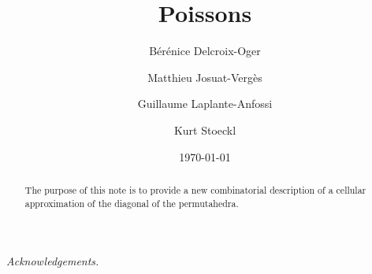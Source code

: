 \documentclass[11pt]{amsart}
\title{Poissons}
\author[B. Delcroix-Oger]{B\'er\'enice Delcroix-Oger}
\author[M. Josuat-Vergès]{Matthieu Josuat-Verg\`es}
\author[G. Laplante-Anfossi]{Guillaume Laplante-Anfossi}
\author[K. Stoeckl]{Kurt Stoeckl}
\date{\today}
\begin{document}

\begin{abstract}
The purpose of this note is to provide a new combinatorial description of a cellular approximation of the diagonal of the permutahedra. 
\end{abstract}


\maketitle


\setcounter{tocdepth}{1}










\bigskip 

\emph{Acknowledgements.}    




\end{document}
